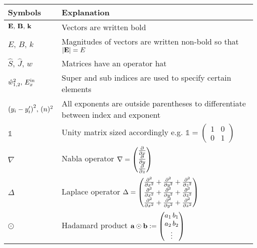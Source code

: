 \begingroup
\renewcommand{\arraystretch}{1.5}
\begin{tabular}{m{4cm} l}
Symbols & Explanation \\
\midrule
$\vb E, \, \vb B, \, \vb k$ & Vectors are written bold \\
$E, \, B, \, k $ &
Magnitudes of vectors are written non-bold so that $\qty|\vb E| = E$ \\
$\hat S, \, \hat J, \, \hat w$ & Matrices have an operator hat \\
$\hat w^2_{1,2}, \, E^{\mathrm{in}}_x$ & Super and sub indices are used to specify certain elements \\
$\qty(y_i - y_i')^2, \, (n)^2$ & All exponents are outside parentheses to differentiate between index and exponent \\
$\mathds 1$ & Unity matrix sized accordingly e.g.
$\mathds 1 = 
\begin{pmatrix}
    1 & 0\\
    0 & 1
\end{pmatrix}$\\
$\nabla$ & Nabla operator
$\nabla
= \begin{pmatrix}
    \pdv x \\
    \pdv y \\
    \pdv z
\end{pmatrix}$ \\
$\Delta$ & Laplace operator $\Delta =
\begin{pmatrix}
    \pdv[2] x + \pdv[2] y + \pdv[2] z \\
    \pdv[2] x + \pdv[2] y + \pdv[2] z \\
    \pdv[2] x + \pdv[2] y + \pdv[2] z 
\end{pmatrix}$\\
$\odot$ & Hadamard product
    $\vb a \odot \vb b :=
    \begin{pmatrix}
        a_1 \, b_1 \\
        a_2 \, b_2 \\
        \vdots
    \end{pmatrix}$\\
\end{tabular}
\endgroup
